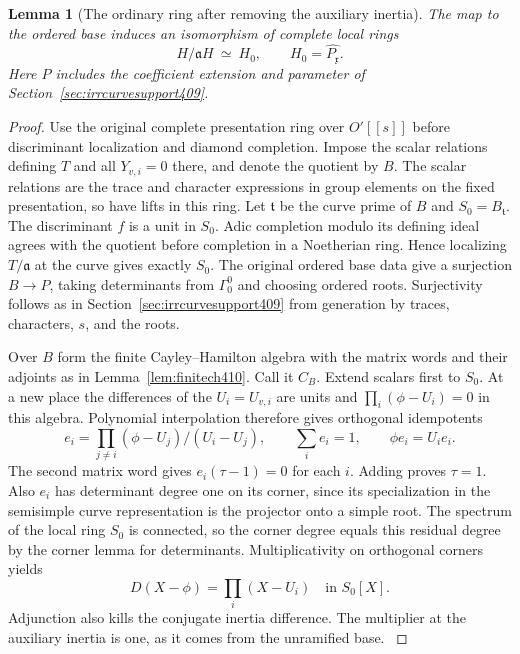 \documentclass[a4paper,11pt]{article}
\newtheorem{lemma}[proposition]{Lemma}
\theoremstyle{definition}
\theoremstyle{remark}
\numberwithin{equation}{section}
\begin{document}
\begin{lemma}[The ordinary ring after removing the auxiliary inertia]\leavevmode
\label{lem:diamondfiber414}
The map to the ordered base induces an isomorphism of
complete local rings
\[
                H/\mathfrak a H\ \simeq\ H_0,
                     \qquad H_0=\widehat{P_{\mathfrak x}} .
\]
Here \(P\) includes the coefficient extension and parameter
of Section~\ref{sec:irrcurvesupport409}.
\end{lemma}
\begin{proof}
Use the original complete presentation ring over \(O'[[s]]\)
before discriminant localization and diamond completion.
Impose the scalar relations defining \(T\) and all
\(Y_{v,i}=0\) there, and denote the quotient by \(B\).
The scalar relations are the trace and character expressions
in group elements on the fixed presentation, so have lifts
in this ring. Let \(\mathfrak t\) be the curve prime of
\(B\) and \(S_0=B_{\mathfrak t}\). The discriminant \(f\)
is a unit in \(S_0\). Adic completion modulo its defining
ideal agrees with the quotient before completion in a
Noetherian ring. Hence localizing \(T/\mathfrak a\) at the
curve gives exactly \(S_0\). The original ordered base data
give a surjection \(B\to P\), taking determinants from
\(\Gamma_0^0\) and choosing ordered roots. Surjectivity
follows as in Section~\ref{sec:irrcurvesupport409} from
generation by traces, characters, \(s\), and the roots.

Over \(B\) form the finite Cayley--Hamilton algebra with the
matrix words and their adjoints as in Lemma~\ref{lem:finitech410}.
Call it \(C_B\). Extend scalars first to \(S_0\). At a new
place the differences of the \(U_i=U_{v,i}\) are units
and \(\prod_i(\phi-U_i)=0\) in this algebra. Polynomial
interpolation therefore gives orthogonal idempotents
\[
           e_i=\prod_{j\ne i}(\phi-U_j)/(U_i-U_j),
                \qquad \sum_i e_i=1,\qquad \phi e_i=U_i e_i .
\]
The second matrix word gives \(e_i(\tau-1)=0\) for each
\(i\). Adding proves \(\tau=1\). Also \(e_i\) has determinant
degree one on its corner, since its specialization in the
semisimple curve representation is the projector onto a
simple root. The spectrum of the local ring \(S_0\) is
connected, so the corner degree equals this residual degree
by the corner lemma for determinants. Multiplicativity on
orthogonal corners yields
\[
                           D(X-\phi)=\prod_i(X-U_i)
                                  \quad\text{in }S_0[X].
\]
Adjunction also kills the conjugate inertia difference.
The multiplier at the auxiliary inertia is one, as it
comes from the unramified base. \cite{VIII-VI-chenevier364}


\end{proof}
\end{document}
